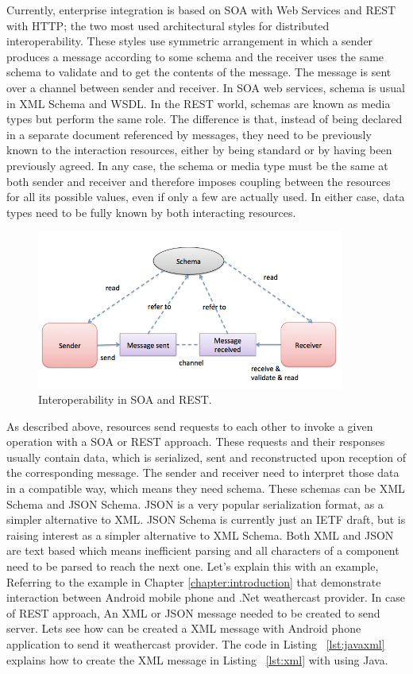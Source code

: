 Currently, enterprise integration is based on SOA with Web Services and REST with HTTP; the two most used architectural styles for distributed interoperability. These styles use symmetric arrangement in which a sender produces a message according to some schema and the receiver uses the same schema to validate and to get the contents of the message. The message is sent over a channel between sender and receiver. In SOA web services, schema is usual in XML Schema and WSDL. In the REST world, schemas are known as media types but perform the same role. The difference is that, instead of being declared in a separate document referenced by messages, they need to be previously known to the interaction resources, either by being standard or by having been previously agreed. In any case, the schema or media type must be the same at both sender and receiver and therefore imposes coupling between the resources for all its possible values, even if only a few are actually used. In either case, data types need to be fully known by both interacting resources.
\begin{figure}[!htb]
  \centering
  \includegraphics[width=0.9\textwidth]{Figures/schema.png}
  \caption[Interoperability in SOA and REST.]{Interoperability in SOA and REST.}
  \label{fig:interoperability}
\end{figure}

As described above, resources send requests to each other to invoke a given operation with a SOA or REST approach. These requests and their responses usually contain data, which is serialized, sent and reconstructed upon reception of the corresponding message.  The sender and receiver need to interpret those data in a compatible way, which means they need schema. These schemas can be XML Schema and JSON Schema. JSON is a very popular serialization format, as a simpler alternative to XML. JSON Schema is currently just an IETF draft\citep{thesis:arch1}, but is raising interest as a simpler alternative to XML Schema. Both XML and JSON are text based which means inefficient parsing and all characters of a component need to be parsed to reach the next one. Let's explain this with an example, Referring to the example in Chapter \ref{chapter:introduction} that demonstrate interaction between Android mobile phone and .Net weathercast provider. In case of REST approach, An XML or JSON message needed to be created to send server. Lets see how can be created a XML message with Android phone application to send it weathercast provider. The code in Listing ~\ref{lst:javaxml} explains how to create the XML message in Listing ~\ref{lst:xml} with using Java.

